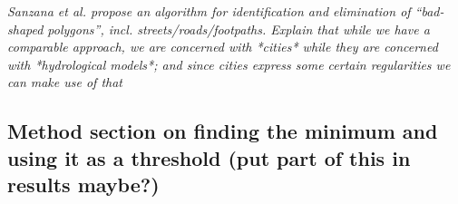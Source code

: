 \textit{Sanzana et al. propose an algorithm for identification and elimination of ``bad-shaped polygons'', incl. streets/roads/footpaths. Explain that while we have a comparable approach, we are concerned with *cities* while they are concerned with *hydrological models*; and since cities express some certain regularities we can make use of that}

\subsection*{Method section on finding the minimum and using it as a threshold (put part of this in results maybe?)}

\begin{figure}
    \centering
    \label{fig:si-dist}
\end{figure}

